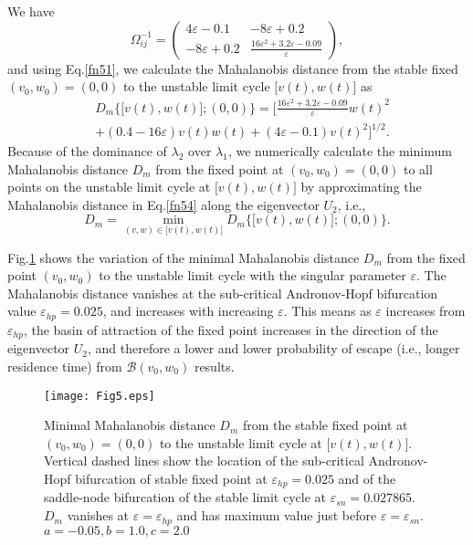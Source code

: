We have
\begin{equation}\label{fn53}
\Omega_{ij}^{-1}=\left( \begin{array}{cc} 4\varepsilon-0.1 & -8\varepsilon+0.2\\
-8\varepsilon+0.2 & \frac{16\varepsilon^2+3.2\varepsilon-0.09}{\varepsilon} \end{array} \right),
\end{equation}
and using Eq.\eqref{fn51}, we calculate the
Mahalanobis distance from the stable fixed $(v_0,w_0)=(0,0)$ to
the unstable limit cycle $\big[v(t),w(t)\big]$ as
\begin{align}\label{fn54}\nonumber
&D_m\Big\{\big[v(t),w(t)\big];(0,0)\Big\}=\Bigg[ \frac{16\varepsilon^2+3.2\varepsilon-0.09}{\varepsilon}w(t)^2\\&
+(0.4-16\varepsilon)v(t)w(t)+(4\varepsilon-0.1)v(t)^2\Bigg]^{1/2}. 
\end{align}
Because of the dominance of $\lambda_2$ over $\lambda_1$, we
numerically calculate the minimum Mahalanobis distance $D_m$ from
the fixed point at $(v_0,w_0)=(0,0)$ to all points on the unstable
limit cycle at $\big[v(t),w(t)\big]$ by approximating the
Mahalanobis distance in Eq.\eqref{fn54} along the eigenvector
$U_2$, i.e.,
\begin{equation}\label{fn55}
D_m=\min_{(v,w)\in\big[v(t),w(t)\big]}D_m\Big\{\big[v(t),w(t)\big];(0,0)\Big\}.
\end{equation}

Fig.\ref{fig:chap34} shows the variation of the minimal
Mahalanobis distance $D_m$ from the fixed point $(v_0,w_0)$ to
the unstable limit cycle with the singular parameter $\varepsilon$.
The Mahalanobis distance vanishes at the sub-critical Andronov-Hopf
bifurcation value $\varepsilon_{hp}=0.025$, and increases with
increasing $\varepsilon$. This means as $\varepsilon$ increases
from $\varepsilon_{hp}$, the basin of attraction of the fixed
point increases in the direction of the eigenvector $U_2$, 
and therefore a lower and lower probability of
escape (i.e., longer residence time) from $\mathcal{B}(v_0,w_0)$ results.
\begin{figure}[H]
\begin{center}
\texttt{[image: Fig5.eps]}
\caption{Minimal Mahalanobis distance $D_m$ from the stable fixed
point at $(v_0,w_0)=(0,0)$ to the unstable limit cycle at
$\big[v(t),w(t)\big]$. Vertical dashed lines show the location
of the sub-critical Andronov-Hopf bifurcation of stable fixed point at
$\varepsilon_{hp}=0.025$ and of the saddle-node bifurcation of the stable
limit cycle at $\varepsilon_{sn}=0.027865$. $D_m$  vanishes at $\varepsilon=\varepsilon_{hp}$ and has maximum
value just before $\varepsilon=\varepsilon_{sn}$. $a=-0.05, b=1.0, c=2.0$} \label{fig:chap34}
\end{center}
\end{figure}

